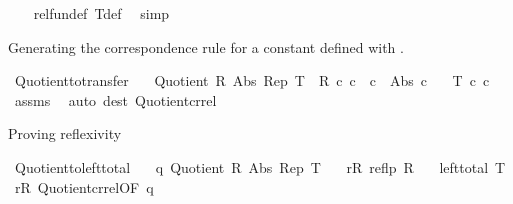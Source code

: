 \begin{isabellebody}
\ \ %
\endisadelimproof
%
\isatagproof
{}\isamarkupfalse%
\ rel{\isacharunderscore}{\kern0pt}fun{\isacharunderscore}{\kern0pt}def\ T{\isacharunderscore}{\kern0pt}def\ \isamarkupfalse%
\ simp%
\endisatagproof
{\isafoldproof}%
%
\isadelimproof
\isanewline
%
\endisadelimproof
\isanewline
{}\isamarkupfalse%
%
\begin{isamarkuptext}%
Generating the correspondence rule for a constant defined with
  .%
\end{isamarkuptext}\isamarkuptrue%
\isamarkupfalse%
\ Quotient{\isacharunderscore}{\kern0pt}to{\isacharunderscore}{\kern0pt}transfer{\isacharcolon}{\kern0pt}\isanewline
\ \ \ {\isachardoublequoteopen}Quotient\ R\ Abs\ Rep\ T{\isachardoublequoteclose}\ \ {\isachardoublequoteopen}R\ c\ c{\isachardoublequoteclose}\ \ {\isachardoublequoteopen}c{\isacharprime}{\kern0pt}\ {\isasymequiv}\ Abs\ c{\isachardoublequoteclose}\isanewline
\ \ \ {\isachardoublequoteopen}T\ c\ c{\isacharprime}{\kern0pt}{\isachardoublequoteclose}\isanewline
%
\isadelimproof
\ \ %
\endisadelimproof
%
\isatagproof
{}\isamarkupfalse%
\ assms\ \isamarkupfalse%
\ {\isacharparenleft}{\kern0pt}auto\ dest{\isacharcolon}{\kern0pt}\ Quotient{\isacharunderscore}{\kern0pt}cr{\isacharunderscore}{\kern0pt}rel{\isacharparenright}{\kern0pt}%
\endisatagproof
{\isafoldproof}%
%
\isadelimproof
%
\endisadelimproof
%
\begin{isamarkuptext}%
Proving reflexivity%
\end{isamarkuptext}\isamarkuptrue%
\isamarkupfalse%
\ Quotient{\isacharunderscore}{\kern0pt}to{\isacharunderscore}{\kern0pt}left{\isacharunderscore}{\kern0pt}total{\isacharcolon}{\kern0pt}\isanewline
\ \ \ q{\isacharcolon}{\kern0pt}\ {\isachardoublequoteopen}Quotient\ R\ Abs\ Rep\ T{\isachardoublequoteclose}\isanewline
\ \ \ r{\isacharunderscore}{\kern0pt}R{\isacharcolon}{\kern0pt}\ {\isachardoublequoteopen}reflp\ R{\isachardoublequoteclose}\isanewline
\ \ \ {\isachardoublequoteopen}left{\isacharunderscore}{\kern0pt}total\ T{\isachardoublequoteclose}\isanewline
%
\isadelimproof
%
\endisadelimproof
%
\isatagproof
{}\isamarkupfalse%
\ r{\isacharunderscore}{\kern0pt}R\ Quotient{\isacharunderscore}{\kern0pt}cr{\isacharunderscore}{\kern0pt}rel{\isacharbrackleft}{\kern0pt}OF\ q{\isacharbrackright}{\kern0pt}\ \isamarkupfalse%

\end{isabellebody}
